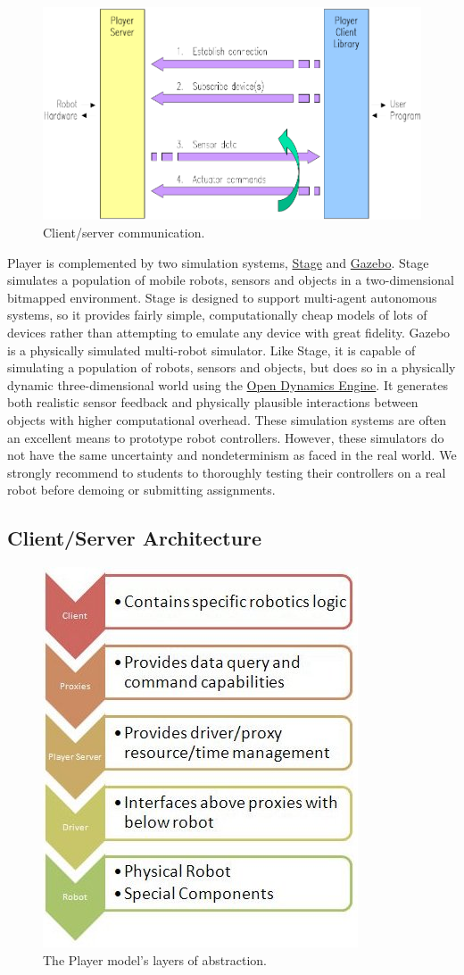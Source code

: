 \begin{figure}[!h]
\centering
\includegraphics[height=0.45\columnwidth]{figures/3_communication.png}
\caption{\label{fig:ClientServer}Client/server communication.}
\end{figure}

Player is complemented by two simulation systems, \href{http://playerstage.sourceforge.net/wiki/Stage}{Stage} and \href{http://playerstage.sourceforge.net/wiki/Gazebo}{Gazebo}.  Stage simulates a population of mobile robots, sensors and objects in a two-dimensional bitmapped environment. Stage is designed to support multi-agent autonomous systems, so it provides fairly simple, computationally cheap models of lots of devices rather than attempting to emulate any device with great fidelity.  Gazebo is a physically simulated multi-robot simulator. Like Stage, it is capable of simulating a population of robots, sensors and objects, but does so in a physically dynamic three-dimensional world using the \href{http://www.ode.org/}{Open Dynamics Engine}. It generates both realistic sensor feedback and physically plausible interactions between objects with higher computational overhead.  These simulation systems are often an excellent means to prototype robot controllers.  However, these simulators do not have the same uncertainty and nondeterminism as faced in the real world.  We strongly recommend to students to thoroughly testing their controllers on a real robot before demoing or submitting assignments.

\subsection{Client/Server Architecture}

\begin{figure}
\centering
\includegraphics[height=0.5\columnwidth]{figures/3_player_model.jpg}
\caption{\label{fig:player_model}The Player model's layers of abstraction.}
\end{figure}

